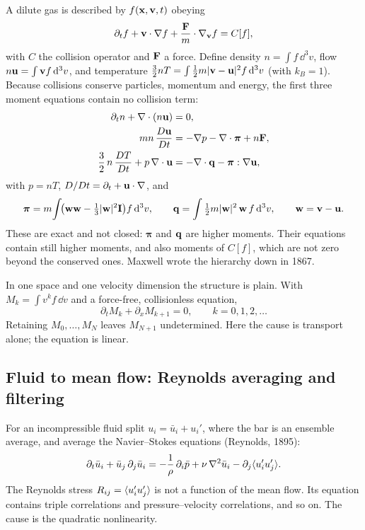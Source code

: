 A dilute gas is described by $f(\mathbf{x},\mathbf{v},t)$ obeying
\begin{equation}
  \partial_t f + \mathbf{v}\cdot\nabla f + \frac{\mathbf{F}}{m}\cdot\nabla_{\mathbf{v}} f = C[f],
  \label{eq:kinetic}
\end{equation}
with $C$ the collision operator and $\mathbf{F}$ a force. Define density
$n=\int f\,\dd^3v$, flow $n\mathbf{u}=\int\mathbf{v} f\,\mathrm{d}^3v$, and temperature
$\tfrac32 nT=\int\tfrac12 m|\mathbf{v}-\mathbf{u}|^2f\,\mathrm{d}^3v$ (with $k_B=1$). Because
collisions conserve particles, momentum and energy, the first three moment
equations contain no collision term:
\begin{align}
  \partial_t n + \nabla\cdot(n\mathbf{u}) &= 0, \label{eq:mass}\\
  mn\,\frac{D\mathbf{u}}{Dt} &= -\nabla p - \nabla\cdot\boldsymbol{\pi} + n\mathbf{F},
     \label{eq:mom}\\
  \frac{3}{2}\,n\,\frac{DT}{Dt} + p\,\nabla\cdot\mathbf{u}
     &= -\nabla\cdot\mathbf{q} - \boldsymbol{\pi}:\nabla\mathbf{u} , \label{eq:energy}
\end{align}
with $p=nT$, $D/Dt = \partial_t+\mathbf{u}\cdot\nabla$, and
\[
  \boldsymbol\pi = m\!\int\!\bigl(\mathbf{w}\mathbf{w}-\tfrac13|\mathbf{w}|^2\mathbf I\bigr)f\,\mathrm{d}^3v,
  \qquad
  \mathbf{q} = \int \tfrac12 m|\mathbf{w}|^2\,\mathbf{w}\,f\,\mathrm{d}^3v,
  \qquad \mathbf{w}=\mathbf{v}-\mathbf{u} .
\]
These are exact and not closed: $\boldsymbol\pi$ and $\mathbf{q}$ are higher
moments. Their equations contain still higher moments, and also moments of
$C[f]$, which are not zero beyond the conserved ones. Maxwell wrote the
hierarchy down in 1867.

In one space and one velocity dimension the structure is plain. With
$M_k=\int v^kf\,\dd v$ and a force-free, collisionless equation,
\begin{equation}
  \partial_t M_k + \partial_x M_{k+1} = 0, \qquad k=0,1,2,\dots
  \label{eq:rawhier}
\end{equation}
Retaining $M_0,\dots,M_N$ leaves $M_{N+1}$ undetermined. Here the cause is
transport alone; the equation is linear.

\subsection{Fluid to mean flow: Reynolds averaging and filtering}

For an incompressible fluid split $u_i=\bar u_i+u_i'$, where the bar is an
ensemble average, and average the Navier--Stokes equations (Reynolds, 1895):
\begin{equation}
  \partial_t \bar u_i + \bar u_j\,\partial_j \bar u_i
  = -\frac{1}{\rho}\,\partial_i \bar p + \nu\,\nabla^2 \bar u_i
    - \partial_j \langle u_i' u_j' \rangle .
  \label{eq:rans}
\end{equation}
The Reynolds stress $R_{ij}=\langle u_i'u_j' \rangle$ is not a function of the mean
flow. Its equation contains triple correlations and pressure--velocity
correlations, and so on. The cause is the quadratic nonlinearity.

